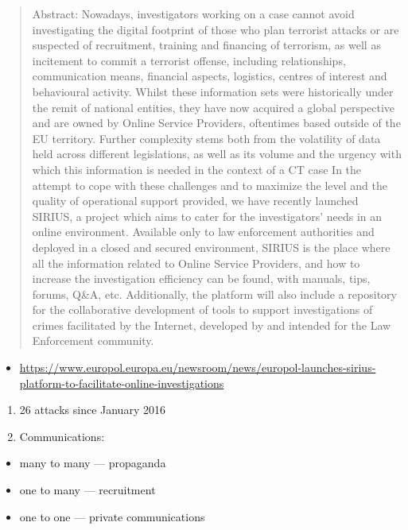 \documentclass[]{book}
\providecommand{\tightlist}{%
  \setlength{\itemsep}{0pt}\setlength{\parskip}{0pt}}
\theoremstyle{definition}
\theoremstyle{definition}
\theoremstyle{definition}
\theoremstyle{remark}
\begin{document}
\begin{quote}
Abstract: Nowadays, investigators working on a case cannot avoid
investigating the digital footprint of those who plan terrorist attacks
or are suspected of recruitment, training and financing of terrorism, as
well as incitement to commit a terrorist offense, including
relationships, communication means, financial aspects, logistics,
centres of interest and behavioural activity. Whilst these information
sets were historically under the remit of national entities, they have
now acquired a global perspective and are owned by Online Service
Providers, oftentimes based outside of the EU territory. Further
complexity stems both from the volatility of data held across different
legislations, as well as its volume and the urgency with which this
information is needed in the context of a CT case In the attempt to cope
with these challenges and to maximize the level and the quality of
operational support provided, we have recently launched SIRIUS, a
project which aims to cater for the investigators' needs in an online
environment. Available only to law enforcement authorities and deployed
in a closed and secured environment, SIRIUS is the place where all the
information related to Online Service Providers, and how to increase the
investigation efficiency can be found, with manuals, tips, forums, Q\&A,
etc. Additionally, the platform will also include a repository for the
collaborative development of tools to support investigations of crimes
facilitated by the Internet, developed by and intended for the Law
Enforcement community.
\end{quote}

\begin{itemize}
\tightlist
\item
  \url{https://www.europol.europa.eu/newsroom/news/europol-launches-sirius-platform-to-facilitate-online-investigations}
\end{itemize}

\begin{enumerate}
\def\labelenumi{\arabic{enumi}.}
\item
  26 attacks since January 2016
\item
  Communications:
\end{enumerate}

\begin{itemize}
\tightlist
\item
  many to many --- propaganda
\item
  one to many --- recruitment
\item
  one to one --- private communications
\end{itemize}
\end{document}

